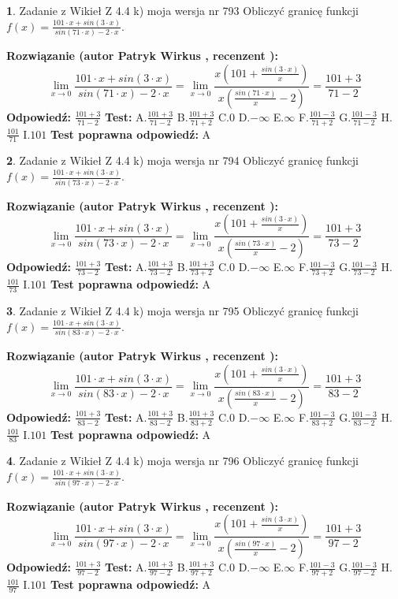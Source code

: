 \documentclass[12pt, a4paper]{article}
\theoremstyle{definition} %
\newtheorem{zad}{}
\newcommand{\zadStart}[1]{\begin{zad}#1\newline}
\newcommand{\zadStop}{\end{zad}}
\newcommand{\rozwStart}[2]{\noindent \textbf{Rozwiązanie (autor #1 , recenzent #2): }\newline}
\newcommand{\rozwStop}{\newline}
\newcommand{\odpStart}{\noindent \textbf{Odpowiedź:}\newline}
\newcommand{\odpStop}{\newline}
\newcommand{\testStart}{\noindent \textbf{Test:}\newline}
\newcommand{\testStop}{\newline}
\newcommand{\kluczStart}{\noindent \textbf{Test poprawna odpowiedź:}\newline}
\newcommand{\kluczStop}{\newline}
\begin{document}
\zadStart{Zadanie z Wikieł Z 4.4 k) moja wersja nr 793}
Obliczyć granicę funkcji $f(x)=\frac{101\cdot x +sin(3\cdot x)}{sin(71\cdot x) -2\cdot x}$.
\zadStop
\rozwStart{Patryk Wirkus}{}
$$\lim\limits_{x\to 0}\frac{101\cdot x +sin(3\cdot x)}{sin(71\cdot x) -2\cdot x}
=\lim\limits_{x\to 0}\frac{x(101+\frac{sin(3\cdot x)}{x})}{x(\frac{sin(71\cdot x)}{x}-2)}
=\frac{101+3}{71-2}$$
\rozwStop
\odpStart
$\frac{101+3}{71-2}$
\odpStop
\testStart
A.$\frac{101+3}{71-2}$
B.$\frac{101+3}{71+2}$
C.$0$
D.$-\infty$
E.$\infty$
F.$\frac{101-3}{71+2}$
G.$\frac{101-3}{71-2}$
H.$\frac{101}{71}$
I.$101$
\testStop
\kluczStart
A
\kluczStop



\zadStart{Zadanie z Wikieł Z 4.4 k) moja wersja nr 794}
Obliczyć granicę funkcji $f(x)=\frac{101\cdot x +sin(3\cdot x)}{sin(73\cdot x) -2\cdot x}$.
\zadStop
\rozwStart{Patryk Wirkus}{}
$$\lim\limits_{x\to 0}\frac{101\cdot x +sin(3\cdot x)}{sin(73\cdot x) -2\cdot x}
=\lim\limits_{x\to 0}\frac{x(101+\frac{sin(3\cdot x)}{x})}{x(\frac{sin(73\cdot x)}{x}-2)}
=\frac{101+3}{73-2}$$
\rozwStop
\odpStart
$\frac{101+3}{73-2}$
\odpStop
\testStart
A.$\frac{101+3}{73-2}$
B.$\frac{101+3}{73+2}$
C.$0$
D.$-\infty$
E.$\infty$
F.$\frac{101-3}{73+2}$
G.$\frac{101-3}{73-2}$
H.$\frac{101}{73}$
I.$101$
\testStop
\kluczStart
A
\kluczStop



\zadStart{Zadanie z Wikieł Z 4.4 k) moja wersja nr 795}
Obliczyć granicę funkcji $f(x)=\frac{101\cdot x +sin(3\cdot x)}{sin(83\cdot x) -2\cdot x}$.
\zadStop
\rozwStart{Patryk Wirkus}{}
$$\lim\limits_{x\to 0}\frac{101\cdot x +sin(3\cdot x)}{sin(83\cdot x) -2\cdot x}
=\lim\limits_{x\to 0}\frac{x(101+\frac{sin(3\cdot x)}{x})}{x(\frac{sin(83\cdot x)}{x}-2)}
=\frac{101+3}{83-2}$$
\rozwStop
\odpStart
$\frac{101+3}{83-2}$
\odpStop
\testStart
A.$\frac{101+3}{83-2}$
B.$\frac{101+3}{83+2}$
C.$0$
D.$-\infty$
E.$\infty$
F.$\frac{101-3}{83+2}$
G.$\frac{101-3}{83-2}$
H.$\frac{101}{83}$
I.$101$
\testStop
\kluczStart
A
\kluczStop



\zadStart{Zadanie z Wikieł Z 4.4 k) moja wersja nr 796}
Obliczyć granicę funkcji $f(x)=\frac{101\cdot x +sin(3\cdot x)}{sin(97\cdot x) -2\cdot x}$.
\zadStop
\rozwStart{Patryk Wirkus}{}
$$\lim\limits_{x\to 0}\frac{101\cdot x +sin(3\cdot x)}{sin(97\cdot x) -2\cdot x}
=\lim\limits_{x\to 0}\frac{x(101+\frac{sin(3\cdot x)}{x})}{x(\frac{sin(97\cdot x)}{x}-2)}
=\frac{101+3}{97-2}$$
\rozwStop
\odpStart
$\frac{101+3}{97-2}$
\odpStop
\testStart
A.$\frac{101+3}{97-2}$
B.$\frac{101+3}{97+2}$
C.$0$
D.$-\infty$
E.$\infty$
F.$\frac{101-3}{97+2}$
G.$\frac{101-3}{97-2}$
H.$\frac{101}{97}$
I.$101$
\testStop
\kluczStart
A
\kluczStop
\end{document}
